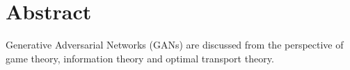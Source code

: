 \section{Abstract}

\vfill
\begin{center}
  \begin{minipage}[center]{0.7\linewidth}
    Generative Adversarial Networks (GANs) are discussed from the perspective of
    game theory, information theory and optimal transport theory.
  \end{minipage}
\end{center}
\vfill

